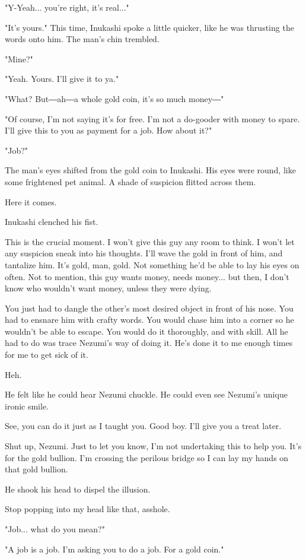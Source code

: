 "Y-Yeah... you're right, it's real..."

"It's yours." This time, Inukashi spoke a little quicker, like he was
thrusting the words onto him. The man's chin trembled.

"Mine?"

"Yeah. Yours. I'll give it to ya."

"What? But―ah―a whole gold coin, it's so much money―"

"Of course, I'm not saying it's for free. I'm not a do-gooder with money
to spare. I'll give this to you as payment for a job. How about it?"

"Job?"

The man's eyes shifted from the gold coin to Inukashi. His eyes were
round, like some frightened pet animal. A shade of suspicion flitted
across them.

Here it comes.

Inukashi clenched his fist.

This is the crucial moment. I won't give this guy any room to think. I
won't let any suspicion sneak into his thoughts. I'll wave the gold in
front of him, and tantalize him. It's gold, man, gold. Not something
he'd be able to lay his eyes on often. Not to mention, this guy wants
money, needs money... but then, I don't know who wouldn't want money,
unless they were dying.

You just had to dangle the other's most desired object in front of his
nose. You had to ensnare him with crafty words. You would chase him into
a corner so he wouldn't be able to escape. You would do it thoroughly,
and with skill. All he had to do was trace Nezumi's way of doing it.
He's done it to me enough times for me to get sick of it.

Heh.

He felt like he could hear Nezumi chuckle. He could even see Nezumi's
unique ironic smile.

See, you can do it just as I taught you. Good boy. I'll give you a treat
later.

Shut up, Nezumi. Just to let you know, I'm not undertaking this to help
you. It's for the gold bullion. I'm crossing the perilous bridge so I
can lay my hands on that gold bullion.

He shook his head to dispel the illusion.

Stop popping into my head like that, asshole.

"Job... what do you mean?"

"A job is a job. I'm asking you to do a job. For a gold coin."

